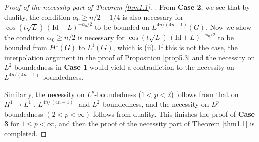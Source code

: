 \documentclass[a4paper,12pt]{amsart}
\numberwithin{equation}{section}
\theoremstyle{definition}
\theoremstyle{remark}
\numberwithin{theorem}{section}
\newcommand{\Id}{\mathrm{Id}}
\begin{document}
\begin{proof}[Proof of the necessity part of Theorem \ref{thm1.1}]
. From {\bf Case 2}, we see that by duality, the condition $\alpha_0\geq n/2-1/4$ is also necessary for $\cos(t\sqrt{L})\,(\Id+L)^{-\alpha_0/2}$ to be bounded on $L^{4n/(4n-1)}(G)$. Now we show the condition $\alpha_0\geq n/2$ is necessary for $\cos (t\sqrt{L})\,(\Id+ L)^{-\alpha_0/2}$ to be bounded from $H^1(G)$ to $L^1(G)$, which is (ii). If this is not the case, the interpolation argument in the proof of Proposition \ref{prop5.3} and the necessity on $L^2$-boundedness in \textbf{Case 1} would yield a contradiction to the necessity on $L^{4n/(4n-1)}$-boundedness. 

Similarly, the necessity on $L^p$-boundedness ($1<p<2$) follows from that on $H^1\to L^1$-, $L^{4n/(4n-1)}$- and $L^2$-boundedness, and the necessity on $L^p$-boundedness $(2<p<\infty)$ follows from duality. This finishes the proof of {\bf Case 3} for $1\leq p<\infty$, and then the proof of the necessity part of Theorem \ref{thm1.1} is completed.
\end{proof}
\medskip
\end{document}
